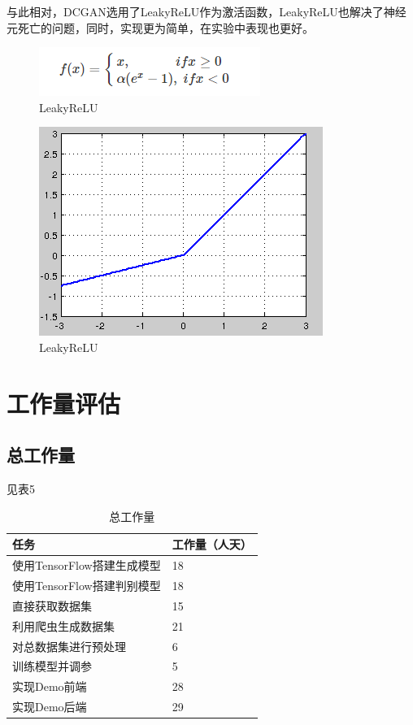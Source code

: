 \documentclass[
  hyperref, a4paper]{ctexart}
\begin{document}
与此相对，DCGAN选用了LeakyReLU作为激活函数，LeakyReLU也解决了神经元死亡的问题，同时，实现更为简单，在实验中表现也更好。

\begin{figure}
\centering
\includegraphics{./17.png}
\caption{LeakyReLU}
\end{figure}

\begin{figure}
\centering
\includegraphics{./18.jpg}
\caption{LeakyReLU}
\end{figure}

\hypertarget{ux5de5ux4f5cux91cfux8bc4ux4f30}{%
\section{工作量评估}\label{ux5de5ux4f5cux91cfux8bc4ux4f30}}

\hypertarget{ux603bux5de5ux4f5cux91cf}{%
\subsection{总工作量}\label{ux603bux5de5ux4f5cux91cf}}

见表5

\begin{table}
    \caption{总工作量}
    \centering
    \begin{tabular}{|p{4.5cm}<{\centering}|p{2.0cm}<{\centering}|}
    \hline
    任务               & 工作量（人天） \\ \hline
    使用TensorFlow搭建生成模型 & 18       \\ \hline
    使用TensorFlow搭建判别模型 & 18       \\ \hline
    直接获取数据集         & 15       \\ \hline
    利用爬虫生成数据集         & 21       \\ \hline
    对总数据集进行预处理         & 6       \\ \hline
    训练模型并调参         & 5       \\ \hline
    实现Demo前端           & 28      \\ \hline
    实现Demo后端         & 29       \\ \hline
    \end{tabular}
\end{table}
\end{document}
